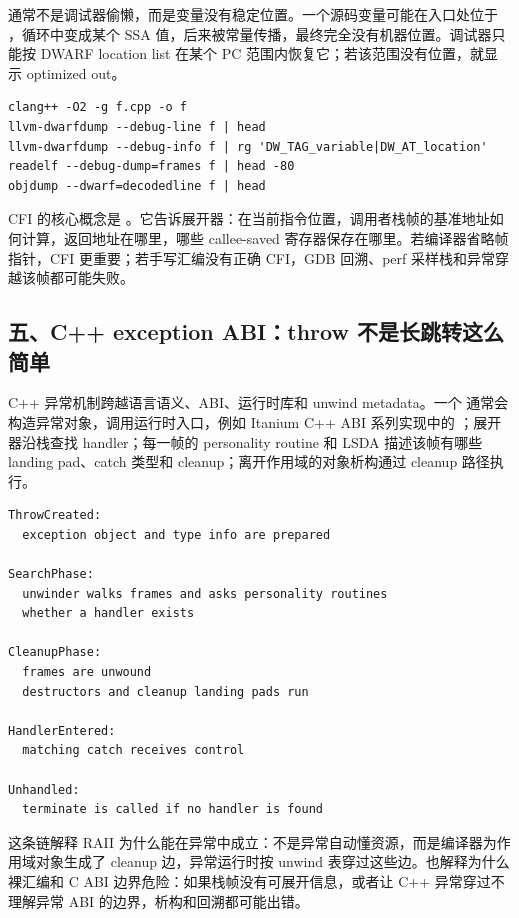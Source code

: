  通常不是调试器偷懒，而是变量没有稳定位置。一个源码变量可能在入口处位于 ，循环中变成某个 SSA 值，后来被常量传播，最终完全没有机器位置。调试器只能按 DWARF location list 在某个 PC 范围内恢复它；若该范围没有位置，就显示 optimized out。

\begin{lstlisting}[numbers=none,caption={调试信息和展开信息证据}]
clang++ -O2 -g f.cpp -o f
llvm-dwarfdump --debug-line f | head
llvm-dwarfdump --debug-info f | rg 'DW_TAG_variable|DW_AT_location'
readelf --debug-dump=frames f | head -80
objdump --dwarf=decodedline f | head
\end{lstlisting}

CFI 的核心概念是 。它告诉展开器：在当前指令位置，调用者栈帧的基准地址如何计算，返回地址在哪里，哪些 callee-saved 寄存器保存在哪里。若编译器省略帧指针，CFI 更重要；若手写汇编没有正确 CFI，GDB 回溯、perf 采样栈和异常穿越该帧都可能失败。

\subsection{五、C++ exception ABI：throw 不是长跳转这么简单}

C++ 异常机制跨越语言语义、ABI、运行时库和 unwind metadata。一个  通常会构造异常对象，调用运行时入口，例如 Itanium C++ ABI 系列实现中的 ；展开器沿栈查找 handler；每一帧的 personality routine 和 LSDA 描述该帧有哪些 landing pad、catch 类型和 cleanup；离开作用域的对象析构通过 cleanup 路径执行。

\begin{lstlisting}[numbers=none,caption={异常传播的压缩状态机}]
ThrowCreated:
  exception object and type info are prepared

SearchPhase:
  unwinder walks frames and asks personality routines
  whether a handler exists

CleanupPhase:
  frames are unwound
  destructors and cleanup landing pads run

HandlerEntered:
  matching catch receives control

Unhandled:
  terminate is called if no handler is found
\end{lstlisting}

这条链解释 RAII 为什么能在异常中成立：不是异常自动懂资源，而是编译器为作用域对象生成了 cleanup 边，异常运行时按 unwind 表穿过这些边。也解释为什么裸汇编和 C ABI 边界危险：如果栈帧没有可展开信息，或者让 C++ 异常穿过不理解异常 ABI 的边界，析构和回溯都可能出错。

